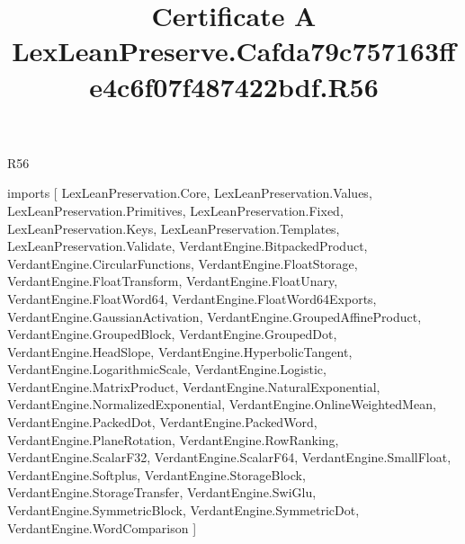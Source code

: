 \begin{lexlean}{R56}
\title{Certificate A LexLeanPreserve.Cafda79c757163ffe4c6f07f487422bdf.R56}
\begin{coremodule}
imports [
  LexLeanPreservation.Core,
  LexLeanPreservation.Values,
  LexLeanPreservation.Primitives,
  LexLeanPreservation.Fixed,
  LexLeanPreservation.Keys,
  LexLeanPreservation.Templates,
  LexLeanPreservation.Validate,
  VerdantEngine.BitpackedProduct,
  VerdantEngine.CircularFunctions,
  VerdantEngine.FloatStorage,
  VerdantEngine.FloatTransform,
  VerdantEngine.FloatUnary,
  VerdantEngine.FloatWord64,
  VerdantEngine.FloatWord64Exports,
  VerdantEngine.GaussianActivation,
  VerdantEngine.GroupedAffineProduct,
  VerdantEngine.GroupedBlock,
  VerdantEngine.GroupedDot,
  VerdantEngine.HeadSlope,
  VerdantEngine.HyperbolicTangent,
  VerdantEngine.LogarithmicScale,
  VerdantEngine.Logistic,
  VerdantEngine.MatrixProduct,
  VerdantEngine.NaturalExponential,
  VerdantEngine.NormalizedExponential,
  VerdantEngine.OnlineWeightedMean,
  VerdantEngine.PackedDot,
  VerdantEngine.PackedWord,
  VerdantEngine.PlaneRotation,
  VerdantEngine.RowRanking,
  VerdantEngine.ScalarF32,
  VerdantEngine.ScalarF64,
  VerdantEngine.SmallFloat,
  VerdantEngine.Softplus,
  VerdantEngine.StorageBlock,
  VerdantEngine.StorageTransfer,
  VerdantEngine.SwiGlu,
  VerdantEngine.SymmetricBlock,
  VerdantEngine.SymmetricDot,
  VerdantEngine.WordComparison
]


\end{coremodule}
\end{lexlean}
